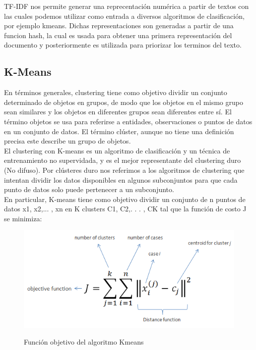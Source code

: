 \documentclass[conference,compsoc]{IEEEtran}
\begin{document}
TF-IDF nos permite generar una reprecentación numérica a partir de textos con
las cuales podemos utilizar como entrada a diversos algoritmos de
clasificación, por ejemplo kmeans. Dichas representaciones son generadas a
partir de una funcion hash, la cual es usada para obtener una primera
representación del documento y posteriormente es utilizada para priorizar los
terminos del texto.\\

\subsection{K-Means}
En términos generales, clustering tiene como objetivo dividir un conjunto
determinado de objetos en grupos, de modo que los objetos en el mismo grupo
sean similares y los objetos en diferentes grupos sean diferentes entre sí. El
término objetos se usa para referirse a entidades, observaciones o puntos de
datos en un conjunto de datos. El término clúster, aunque no tiene una
definición precisa este describe un grupo de objetos.\\

El clustering con K-means es un algoritmo de clasificación y un técnica de
entrenamiento no supervidada, y es el mejor representante del clustering duro
(No difuso). Por clústeres duro nos referimos a los algoritmos de clustering
que intentan dividir los datos disponibles en algunos subconjuntos para que
cada punto de datos solo puede pertenecer a un subconjunto.\\

En particular, K-means tiene como objetivo dividir un conjunto de n puntos de
datos x1, x2,... , xn en K clusters C1, C2,. . . , CK tal que la función de
costo J se minimiza:

\begin{figure}[H]
    \centering
    \includegraphics[scale=0.6]{kmeans.png}
    \caption{Función objetivo del algoritmo Kmeans} \cite{kmeans}
\end{figure}
\end{document}
